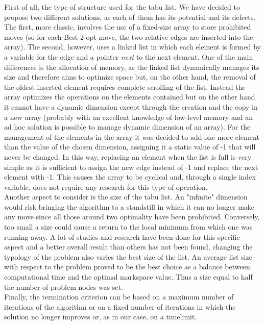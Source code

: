 First of all, the type of structure used for the tabu list. We have decided to propose two different solutions, as each of them has its potential and its defects. The first, more classic, involves the use of a fixed-size array to store prohibited moves (so for each Best-2-opt move, the two relative edges are inserted into the array). The second, however, uses a linked list in which each element is formed by a variable for the edge and a pointer \textit{next} to the next element.
One of the main differences is the allocation of memory, as the linked list dynamically manages its size and therefore aims to optimize space but, on the other hand, the removal of the oldest inserted element requires complete scrolling of the list. Instead the array optimizes the operations on the elements contained but on the other hand it cannot have a dynamic dimension except through the creation and the copy in a new array (probably with an excellent knowledge of low-level memory and an ad hoc solution is possible to manage dynamic dimension of an array). For the management of the elements in the array it was decided to add one more element than the value of the chosen dimension, assigning it a static value of -1 that will never be changed. In this way, replacing an element when the list is full is very simple as it is sufficient to assign the new edge instead of -1 and replace the next element with -1. This causes the array to be cyclical and, through a single index variable, does not require any research for this type of operation.\\
Another aspect to consider is the size of the tabu list. An "infinite" dimension would risk bringing the algorithm to a standstill in which it can no longer make any move since all those around two optimality have been prohibited. Conversely, too small a size could cause a return to the local minimum from which one was running away. A lot of studies and research have been done for this specific aspect \cite{Nababan_2019, Tsubakitani1998} and a better overall result than others has not been found, changing the typology of the problem also varies the best size of the list. An average list size with respect to the problem proved to be the best choice as a balance between computational time and the optimal markspace value. Thus a size equal to half the number of problem nodes was set.\\
Finally, the termination criterion can be based on a maximum number of iterations of the algorithm or on a fixed number of iterations in which the solution no longer improves or, as in our case, on a timelimit.

